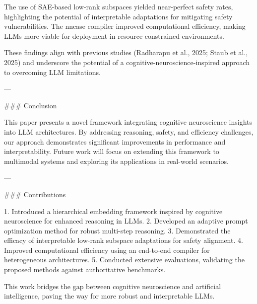 The use of SAE-based low-rank subspaces yielded near-perfect safety rates, highlighting the potential of interpretable adaptations for mitigating safety vulnerabilities. The nncase compiler improved computational efficiency, making LLMs more viable for deployment in resource-constrained environments.

These findings align with previous studies (Radharapu et al., 2025; Staub et al., 2025) and underscore the potential of a cognitive-neuroscience-inspired approach to overcoming LLM limitations.

---

### Conclusion

This paper presents a novel framework integrating cognitive neuroscience insights into LLM architectures. By addressing reasoning, safety, and efficiency challenges, our approach demonstrates significant improvements in performance and interpretability. Future work will focus on extending this framework to multimodal systems and exploring its applications in real-world scenarios.

---

### Contributions

1. Introduced a hierarchical embedding framework inspired by cognitive neuroscience for enhanced reasoning in LLMs.
2. Developed an adaptive prompt optimization method for robust multi-step reasoning.
3. Demonstrated the efficacy of interpretable low-rank subspace adaptations for safety alignment.
4. Improved computational efficiency using an end-to-end compiler for heterogeneous architectures.
5. Conducted extensive evaluations, validating the proposed methods against authoritative benchmarks.

This work bridges the gap between cognitive neuroscience and artificial intelligence, paving the way for more robust and interpretable LLMs.